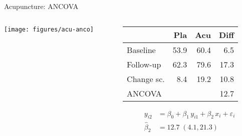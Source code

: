\documentclass[aspectratio=169]{beamer}
\begin{document}
\begin{frame}{Acupuncture: ANCOVA}
\begin{columns}[T]
\begin{column}{5.5cm}
  \texttt{[image: figures/acu-anco]}
\end{column}
%
\begin{column}{5.5cm}
  \vspace*{1em}\small
  \begin{tabular}{lrrr}
  \hline
             &  Pla &  Acu & Diff \\ \hline
  Baseline   & 53.9 & 60.4 &  6.5 \\
  Follow-up  & 62.3 & 79.6 & 17.3 \\
  Change sc. &  8.4 & 19.2 & 10.8 \\
  ANCOVA     &      &      & 12.7 \\ \hline
  \end{tabular}
\begin{align*}
         y_{i2} &= \beta_0 + \beta_1 \, y_{i1} + \beta_2 \, x_i +
                    \varepsilon_i \\
  \hat{\beta}_2 &= 12.7 \; (4.1, 21.3)
\end{align*}
\end{column}
\end{columns}
\end{frame}
\end{document}
